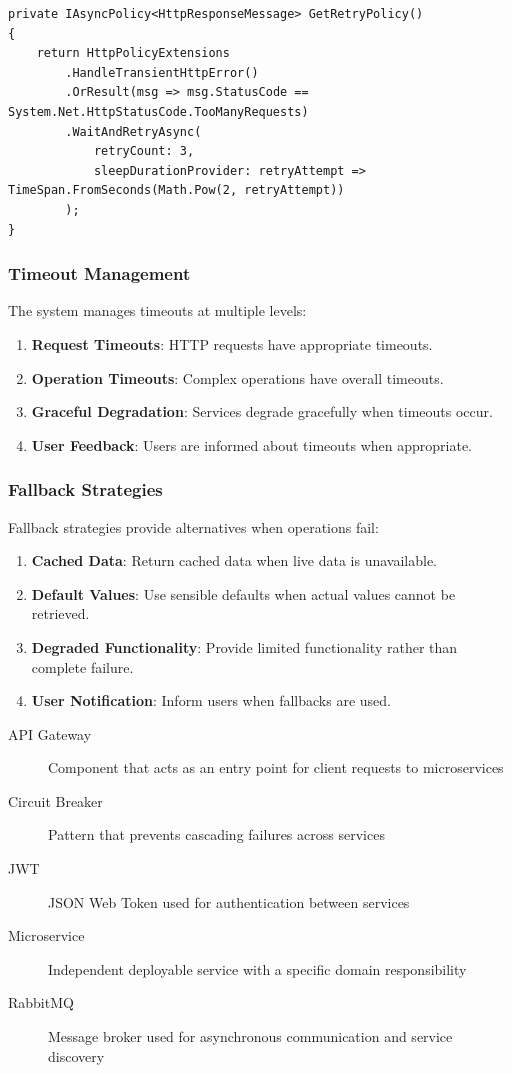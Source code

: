 \begin{verbatim}
private IAsyncPolicy<HttpResponseMessage> GetRetryPolicy()
{
    return HttpPolicyExtensions
        .HandleTransientHttpError()
        .OrResult(msg => msg.StatusCode == System.Net.HttpStatusCode.TooManyRequests)
        .WaitAndRetryAsync(
            retryCount: 3,
            sleepDurationProvider: retryAttempt => TimeSpan.FromSeconds(Math.Pow(2, retryAttempt))
        );
}
\end{verbatim}

\subsubsection{Timeout Management}

The system manages timeouts at multiple levels:

\begin{enumerate}
   \item \textbf{Request Timeouts}: HTTP requests have appropriate timeouts.
   \item \textbf{Operation Timeouts}: Complex operations have overall timeouts.
   \item \textbf{Graceful Degradation}: Services degrade gracefully when timeouts occur.
   \item \textbf{User Feedback}: Users are informed about timeouts when appropriate.
\end{enumerate}

\subsubsection{Fallback Strategies}

Fallback strategies provide alternatives when operations fail:

\begin{enumerate}
   \item \textbf{Cached Data}: Return cached data when live data is unavailable.
   \item \textbf{Default Values}: Use sensible defaults when actual values cannot be retrieved.
   \item \textbf{Degraded Functionality}: Provide limited functionality rather than complete failure.
   \item \textbf{User Notification}: Inform users when fallbacks are used.
\end{enumerate}

\begin{terminology}
\begin{description}
    \item[API Gateway] Component that acts as an entry point for client requests to microservices
    \item[Circuit Breaker] Pattern that prevents cascading failures across services
    \item[JWT] JSON Web Token used for authentication between services
    \item[Microservice] Independent deployable service with a specific domain responsibility
    \item[RabbitMQ] Message broker used for asynchronous communication and service discovery
\end{description}
\end{terminology}